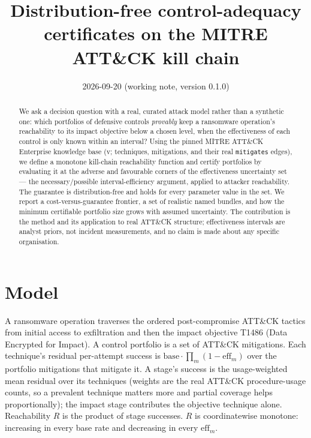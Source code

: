 \documentclass[11pt]{article}
\title{Distribution-free control-adequacy certificates on the MITRE ATT\&CK kill chain}
\author{}
\date{2026-09-20 (working note, version 0.1.0)}
\begin{document}
\maketitle

\begin{abstract}
We ask a decision question with a real, curated attack model rather than a
synthetic one: which portfolios of defensive controls \emph{provably} keep a
ransomware operation's reachability to its impact objective below a chosen level,
when the effectiveness of each control is only known within an interval? Using the
pinned MITRE ATT\&CK Enterprise knowledge base (v\CertAttackVersion; \CertTechniques{}
techniques, \CertMitigations{} mitigations, and their real \texttt{mitigates}
edges), we define a monotone kill-chain reachability function and certify
portfolios by evaluating it at the adverse and favourable corners of the
effectiveness uncertainty set --- the necessary/possible interval-efficiency
argument, applied to attacker reachability. The guarantee is distribution-free and
holds for every parameter value in the set. We report a cost-versus-guarantee
frontier, a set of realistic named bundles, and how the minimum certifiable
portfolio size grows with assumed uncertainty. The contribution is the method and
its application to real ATT\&CK structure; effectiveness intervals are analyst
priors, not incident measurements, and no claim is made about any specific
organisation.
\end{abstract}

\section{Model}
A ransomware operation traverses the ordered post-compromise ATT\&CK tactics from
initial access to exfiltration and then the impact objective T1486 (Data Encrypted
for Impact). A control portfolio is a set of ATT\&CK mitigations. Each technique's
residual per-attempt success is $\mathrm{base}\cdot\prod_{m}(1-\mathrm{eff}_m)$ over
the portfolio mitigations that mitigate it. A stage's success is the
usage-weighted mean residual over its techniques (weights are the real ATT\&CK
procedure-usage counts, so a prevalent technique matters more and partial coverage
helps proportionally); the impact stage contributes the objective technique alone.
Reachability $R$ is the product of stage successes. $R$ is coordinatewise monotone:
increasing in every base rate and decreasing in every $\mathrm{eff}_m$.
\end{document}
